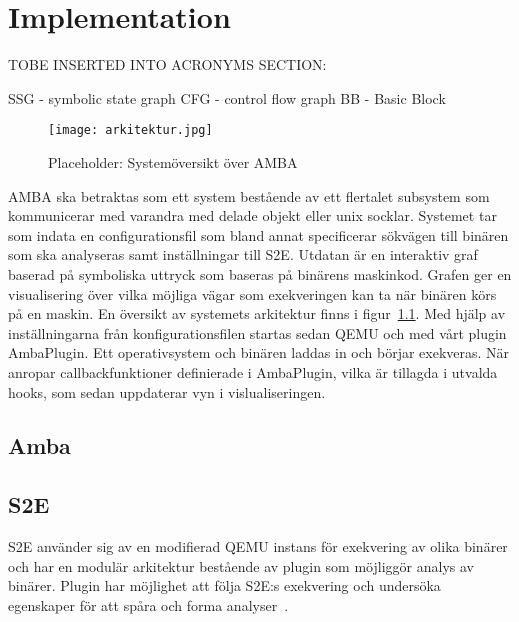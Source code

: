 \chapter{Implementation}

TOBE INSERTED INTO ACRONYMS SECTION:

SSG - symbolic state graph
CFG - control flow graph
BB - Basic Block


\begin{figure}
    \centering
    \texttt{[image: arkitektur.jpg]}
    \caption{Placeholder: Systemöversikt över AMBA}
    \label{fig:arkitektur}
\end{figure}

% 

AMBA ska betraktas som ett system bestående av ett flertalet subsystem som kommunicerar med varandra med delade objekt eller unix socklar.
Systemet tar som indata en configurationsfil som bland annat specificerar sökvägen till binären som ska analyseras samt inställningar till S2E.
Utdatan är en interaktiv graf baserad på symboliska uttryck som baseras på binärens maskinkod.
Grafen ger en visualisering över vilka möjliga vägar som exekveringen kan ta när binären körs på en maskin.
En översikt av systemets arkitektur finns i figur~\ref{fig:arkitektur}.
Med hjälp av inställningarna från konfigurationsfilen startas sedan QEMU och \stoe med vårt \stoe plugin AmbaPlugin.
Ett operativsystem och binären laddas in och börjar exekveras.
När \stoe anropar callbackfunktioner definierade i AmbaPlugin, vilka är tillagda i utvalda \stoe hooks, som sedan uppdaterar vyn i vislualiseringen.

\section{Amba}


\section{S2E}
S2E använder sig av en modifierad QEMU instans för exekvering av olika binärer och har en modulär arkitektur bestående av plugin som möjliggör analys av binärer. Plugin har möjlighet att följa S2E:s exekvering och undersöka egenskaper för att spåra och forma analyser~\cite{Chipounov12}.

